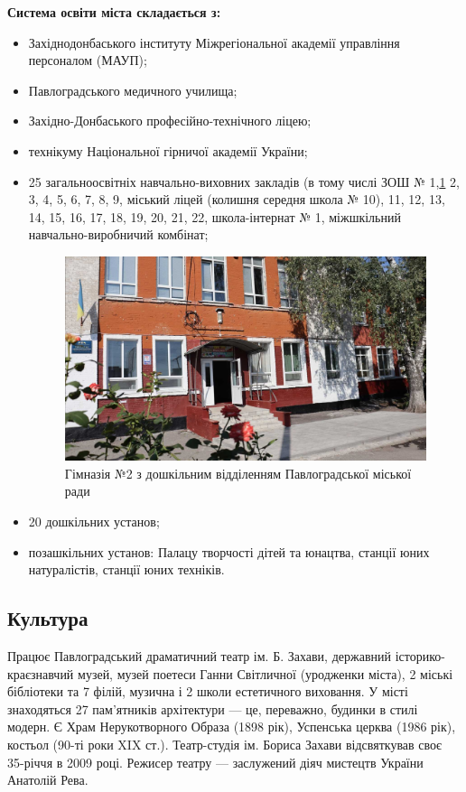 \textbf{Система освіти міста складається з:}

\begin{itemize}
\item Західнодонбаського інституту Міжрегіональної академії управління персоналом (МАУП);
\item Павлоградського медичного училища;
\item Західно-Донбаського професійно-технічного ліцею;
\item технікуму Національної гірничої академії України;
\item 25 загальноосвітніх навчально-виховних закладів (в тому числі ЗОШ № 1,\ref{fig:wkola} 2, 3, 4, 5, 6, 7, 8, 9, міський ліцей (колишня середня школа № 10), 11, 12, 13, 14, 15, 16, 17, 18, 19, 20, 21, 22, школа-інтернат № 1, міжшкільний навчально-виробничий комбінат;
\begin{figure}[h]
	\centering
	\includegraphics[width=0.6\linewidth]{./images-mylyar/wkola.jpg}
	\caption{
		\centering
		Гімназія №2 з дошкільним відділенням Павлоградської міської ради}
	\label{fig:wkola}
\end{figure}
\item 20 дошкільних установ;
\item позашкільних установ: Палацу творчості дітей та юнацтва, станції юних натуралістів, станції юних техніків.
\end{itemize}
\subsection{Культура}

 Працює Павлоградський драматичний театр ім. Б. Захави, державний історико-краєзнавчий музей, музей поетеси Ганни Світличної (уродженки міста), 2 міські бібліотеки та 7 філій, музична і 2 школи естетичного виховання. У місті знаходяться 27 пам'ятників архітектури — це, переважно, будинки в стилі модерн. Є Храм Нерукотворного Образа (1898 рік), Успенська церква (1986 рік), костьол (90-ті роки XIX ст.). Театр-студія ім. Бориса Захави відсвяткував своє 35-річчя в 2009 році. Режисер театру — заслужений діяч мистецтв України Анатолій Рева.



